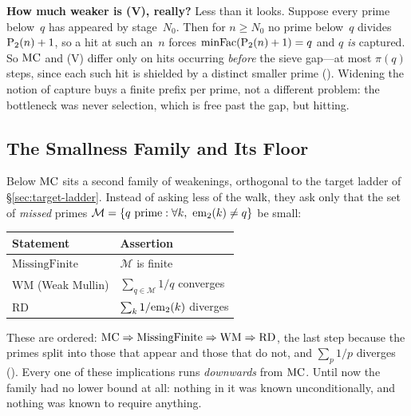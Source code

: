 \begin{aside}
\textbf{How much weaker is (V), really?}  Less than it looks.  Suppose
every prime below~$q$ has appeared by stage~$N_0$.  Then for $n \geq
N_0$ no prime below~$q$ divides $\mathrm{P}_{2}(n)+1$, so a hit at such an~$n$
forces $\mathrm{minFac}(\mathrm{P}_{2}(n)+1) = q$ and $q$ \emph{is} captured.  So
$\mathrm{MC}$ and (V) differ only on hits occurring \emph{before} the sieve
gap---at most $\pi(q)$ steps, since each such hit is shielded by a
distinct smaller prime
().
Widening the notion of capture buys a finite prefix per prime, not a
different problem: the bottleneck was never selection, which is free
past the gap, but hitting.
\end{aside}

\subsection{The Smallness Family and Its Floor}
\label{sec:composite-floor}

Below $\mathrm{MC}$ sits a second family of weakenings, orthogonal to the target
ladder of \S\ref{sec:target-ladder}.  Instead of asking less of the
walk, they ask only that the set of \emph{missed} primes
$\mathcal{M} = \{q \text{ prime} : \forall k,\ \mathrm{em}_{2}(k) \neq q\}$ be small:

\begin{center}
\begin{tabular}{@{}l@{\quad}l@{}}
\toprule
\textbf{Statement} & \textbf{Assertion} \\
\midrule
$\mathrm{MissingFinite}$ & $\mathcal{M}$ is finite \\
$\mathrm{WM}$ (Weak Mullin) & $\sum_{q \in \mathcal{M}} 1/q$ converges \\
$\mathrm{RD}$ & $\sum_k 1/\mathrm{em}_{2}(k)$ diverges \\
\bottomrule
\end{tabular}
\end{center}

\smallskip\noindent
These are ordered: $\mathrm{MC} \Rightarrow \mathrm{MissingFinite} \Rightarrow
\mathrm{WM} \Rightarrow \mathrm{RD}$, the last step because the primes
split into those that appear and those that do not, and
$\sum_p 1/p$ diverges
().  Every one of
these implications runs \emph{downwards} from $\mathrm{MC}$.  Until now the
family had no lower bound at all: nothing in it was known
unconditionally, and nothing was known to require anything.

